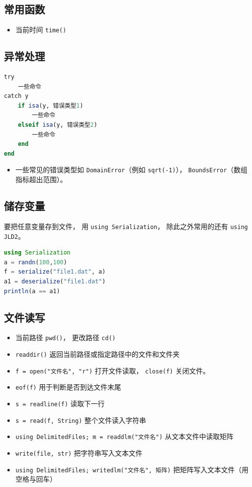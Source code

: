 \subsection{常用函数}
\begin{itemize}
\item 当前时间 \verb`time()`
\end{itemize}

\subsection{异常处理}
\begin{lstlisting}[language=julia]
try 
    一些命令
catch y
    if isa(y, 错误类型1)
        一些命令
    elseif isa(y, 错误类型2)
        一些命令
    end
end
\end{lstlisting}
\begin{itemize}
\item 一些常见的错误类型如 \verb`DomainError`（例如 \verb`sqrt(-1)`）， \verb`BoundsError`（数组指标超出范围）。
\end{itemize}


\subsection{储存变量}
要把任意变量存到文件， 用 \verb`using Serialization`， 除此之外常用的还有 \verb`using JLD2`。
\begin{lstlisting}[language=julia]
using Serialization
a = randn(100,100)
f = serialize("file1.dat", a)
a1 = deserialize("file1.dat")
println(a == a1)
\end{lstlisting}

\subsection{文件读写}
\begin{itemize}
\item 当前路径 \verb`pwd()`， 更改路径 \verb`cd()`
\item \verb`readdir()` 返回当前路径或指定路径中的文件和文件夹
\item \verb`f = open("文件名", "r")` 打开文件读取， \verb`close(f)` 关闭文件。
\item \verb`eof(f)` 用于判断是否到达文件末尾
\item \verb`s = readline(f)` 读取下一行
\item \verb`s = read(f, String)` 整个文件读入字符串
\item \verb`using DelimitedFiles; m = readdlm("文件名")` 从文本文件中读取矩阵
\item \verb`write(file, str)` 把字符串写入文本文件
\item \verb`using DelimitedFiles; writedlm("文件名", 矩阵)` 把矩阵写入文本文件（用空格与回车）
\end{itemize}


